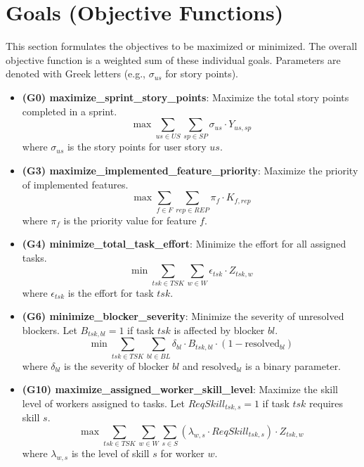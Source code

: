\documentclass[11pt]{article}
\begin{document}
\section{Goals (Objective Functions)}
This section formulates the objectives to be maximized or minimized. The overall objective function is a weighted sum of these individual goals. Parameters are denoted with Greek letters (e.g., $\sigma_{us}$ for story points).
\begin{itemize}
    \item \textbf{(G0) maximize\_sprint\_story\_points}: Maximize the total story points completed in a sprint.
    $$ \max \sum_{us \in US} \sum_{sp \in SP} \sigma_{us} \cdot Y_{us,sp} $$
    where $\sigma_{us}$ is the story points for user story $us$.

    \item \textbf{(G3) maximize\_implemented\_feature\_priority}: Maximize the priority of implemented features.
    $$ \max \sum_{f \in F} \sum_{rep \in REP} \pi_{f} \cdot K_{f,rep} $$
    where $\pi_{f}$ is the priority value for feature $f$.

    \item \textbf{(G4) minimize\_total\_task\_effort}: Minimize the effort for all assigned tasks.
    $$ \min \sum_{tsk \in TSK} \sum_{w \in W} \epsilon_{tsk} \cdot Z_{tsk,w} $$
    where $\epsilon_{tsk}$ is the effort for task $tsk$.
    
    \item \textbf{(G6) minimize\_blocker\_severity}: Minimize the severity of unresolved blockers. Let $B_{tsk,bl}=1$ if task $tsk$ is affected by blocker $bl$.
    $$ \min \sum_{tsk \in TSK} \sum_{bl \in BL} \delta_{bl} \cdot B_{tsk,bl} \cdot (1 - \text{resolved}_{bl}) $$
    where $\delta_{bl}$ is the severity of blocker $bl$ and $\text{resolved}_{bl}$ is a binary parameter.

    \item \textbf{(G10) maximize\_assigned\_worker\_skill\_level}: Maximize the skill level of workers assigned to tasks. Let $ReqSkill_{tsk,s}=1$ if task $tsk$ requires skill $s$.
    $$ \max \sum_{tsk \in TSK} \sum_{w \in W} \sum_{s \in S} (\lambda_{w,s} \cdot ReqSkill_{tsk,s}) \cdot Z_{tsk,w} $$
    where $\lambda_{w,s}$ is the level of skill $s$ for worker $w$.
\end{itemize}
\end{document}
